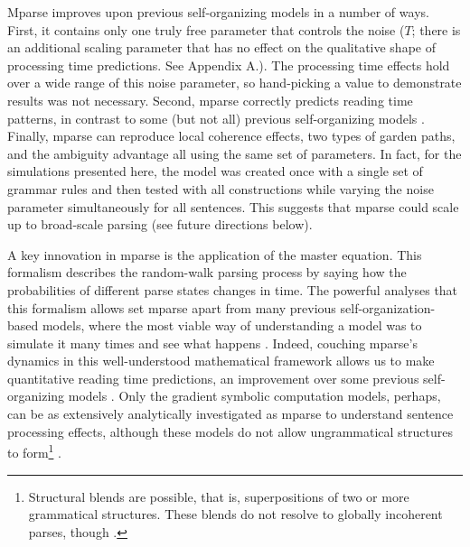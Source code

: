 \documentclass[a4paper, 12pt]{article}
\begin{document}
Mparse improves upon previous self-organizing models in a number of ways.
First, it contains only one truly free parameter that controls the noise ($T$;
there is an additional scaling parameter that has no effect on the qualitative
shape of processing time predictions. See Appendix A.). The processing time
effects hold over a wide range of this noise parameter, so hand-picking a value
to demonstrate results was not necessary. Second, mparse correctly predicts
reading time patterns, in contrast to some (but not all) previous
self-organizing models \citep[e.g.,][]{kempen1989incremental, smith2018self}.
Finally, mparse can reproduce local coherence effects, two types of garden
paths, and the ambiguity advantage all using the same set of parameters. In
fact, for the simulations presented here, the model was created once with a
single set of grammar rules and then tested with all constructions while
varying the noise parameter simultaneously for all sentences. This suggests
that mparse could scale up to broad-scale parsing (see future directions below).

A key innovation in mparse is the application of the master equation. This
formalism describes the random-walk parsing process by saying how the
probabilities of different parse states changes in time. The powerful analyses
that this formalism allows \citep{oppenheim1977stochastic,
    iyer-biswas2016first, polizzi2016mean, vankampen2007stochastic} set mparse
apart from many previous self-organization-based models, where the most viable
way of understanding a model was to simulate it many times and see what
happens
\citep{kempen1989incremental, vosse2000syntactic, vosse2009unification,
    tabor2004evidence, smith2018toward, smith2018self, smith2021encoding}.
Indeed, couching mparse's dynamics in this well-understood mathematical
framework allows us to make quantitative reading time predictions, an
improvement over some previous self-organizing models
\citep[e.g.,][]{smith2018self, kempen1989incremental}. Only
the gradient symbolic computation models, perhaps, can be as extensively
analytically investigated as mparse to understand sentence processing effects,
although these models do not allow ungrammatical structures to
form\footnote{Structural blends are possible, that is, superpositions of two or
more grammatical structures. These blends do not resolve to globally incoherent
parses, though \citep{cho2017incremental}.}
\citep{cho2016bifurcation, cho2017incremental, cho2018dynamic,
    tupper2018discrete}.%
\end{document}
